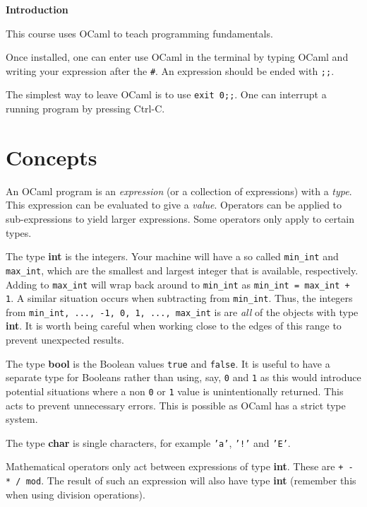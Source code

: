 \documentclass[12pt]{article}
\begin{document}
\begin{center}\LARGE\bf
    Introduction
\end{center}

This course uses OCaml to teach programming fundamentals.

Once installed, one can enter use OCaml in the terminal by typing OCaml and writing your expression
after the \texttt{\#}. An expression should be ended with \texttt{;;}.

The simplest way to leave OCaml is to use \texttt{exit 0;;}. One can interrupt a running program by
pressing Ctrl-C.

\section{Concepts}
An OCaml program is an \textit{expression} (or a collection of expressions) with a \textit{type}.
This expression can be evaluated to give a \textit{value}. Operators can be applied to sub-expressions
to yield larger expressions. Some operators only apply to certain types.

The type \textbf{int} is the integers. Your machine will have a so called \texttt{min\_int} and \texttt{max\_int}, which
are the smallest and largest integer that is available, respectively. Adding to \texttt{max\_int} will
wrap back around to \texttt{min\_int} as \texttt{min\_int = max\_int + 1}. A similar situation occurs when
subtracting from \texttt{min\_int}. Thus, the integers from \texttt{min\_int, ..., -1, 0, 1, ..., max\_int} is
are \textit{all} of the objects with type \textbf{int}. It is worth being careful when working close to the edges of this range
to prevent unexpected results.

The type \textbf{bool} is the Boolean values \texttt{true} and \texttt{false}. It is useful to have
a separate type for Booleans rather than using, say, \texttt{0} and \texttt{1} as this would introduce
potential situations where a non \texttt{0} or \texttt{1} value is unintentionally returned. This acts
to prevent unnecessary errors. This is possible as OCaml has a strict type system.

The type \textbf{char} is single characters, for example \texttt{'a'}, \texttt{'!'} and \texttt{'E'}.

Mathematical operators only act between expressions of type \textbf{int}. These are \texttt{+ - * / mod}.
The result of such an expression will also have type \textbf{int} (remember this when using division operations).
\end{document}
